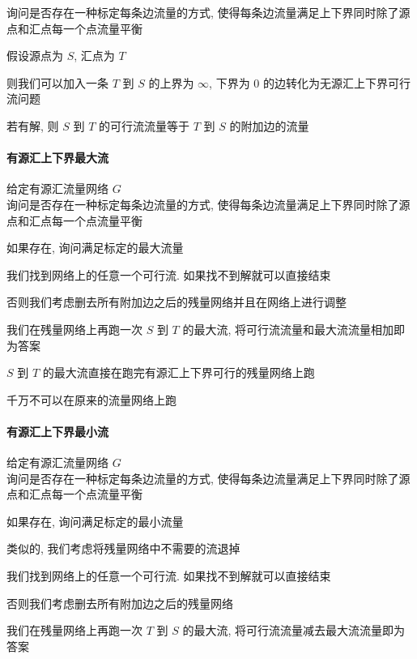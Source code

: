 询问是否存在一种标定每条边流量的方式, 使得每条边流量满足上下界同时除了源点和汇点每一个点流量平衡

假设源点为 \(S\), 汇点为 \(T\)

则我们可以加入一条 \(T\) 到 \(S\) 的上界为 \(\infty\), 下界为 \(0\) 的边转化为无源汇上下界可行流问题

若有解, 则 \(S\) 到 \(T\) 的可行流流量等于 \(T\) 到 \(S\) 的附加边的流量

\paragraph{有源汇上下界最大流} 给定有源汇流量网络 \(G\)~\\

询问是否存在一种标定每条边流量的方式, 使得每条边流量满足上下界同时除了源点和汇点每一个点流量平衡

如果存在, 询问满足标定的最大流量

我们找到网络上的任意一个可行流. 如果找不到解就可以直接结束

否则我们考虑删去所有附加边之后的残量网络并且在网络上进行调整

我们在残量网络上再跑一次 \(S\) 到 \(T\) 的最大流, 将可行流流量和最大流流量相加即为答案

\(S\) 到 \(T\) 的最大流直接在跑完有源汇上下界可行的残量网络上跑

千万不可以在原来的流量网络上跑

\paragraph{有源汇上下界最小流} 给定有源汇流量网络 \(G\)~\\

询问是否存在一种标定每条边流量的方式, 使得每条边流量满足上下界同时除了源点和汇点每一个点流量平衡

如果存在, 询问满足标定的最小流量

类似的, 我们考虑将残量网络中不需要的流退掉

我们找到网络上的任意一个可行流. 如果找不到解就可以直接结束

否则我们考虑删去所有附加边之后的残量网络

我们在残量网络上再跑一次 \(T\) 到 \(S\) 的最大流, 将可行流流量减去最大流流量即为答案